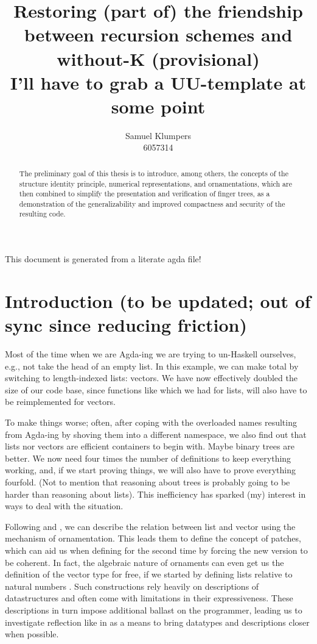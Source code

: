 \documentclass{article}
\title{Restoring (part of) the friendship between recursion schemes and without-K (provisional)\\ \small I'll have to grab a UU-template at some point}
\author{Samuel Klumpers\\6057314}
\theoremstyle{plain}%
\theoremstyle{definition}
\begin{document}
\maketitle
\tableofcontents

This document is generated from a literate agda file!
\newpage

\begin{abstract}
    The preliminary goal of this thesis is to introduce, among others, the concepts of the structure identity principle, numerical representations, and ornamentations, which are then combined to simplify the presentation and verification of finger trees, as a demonstration of the generalizability and improved compactness and security of the resulting code. 
\end{abstract}

\section{Introduction (to be updated; out of sync since reducing friction)}\label{sec:intro}
Most of the time when we are Agda-ing \cite{agda} we are trying to un-Haskell ourselves, e.g., not take the head of an empty list. In this example, we can make  total by switching to length-indexed lists: vectors. We have now effectively doubled the size of our code base, since functions like \AgdaFunction{\_++\_} which we had for lists, will also have to be reimplemented for vectors.

To make things worse; often, after coping with the overloaded names resulting from Agda-ing by shoving them into a different namespace, we also find out that lists nor vectors are efficient containers to begin with. Maybe binary trees are better. We now need four times the number of definitions to keep everything working, and, if we start proving things, we will also have to prove everything fourfold. (Not to mention that reasoning about trees is probably going to be harder than reasoning about lists).  This inefficiency has sparked (my) interest in ways to deal with the situation.

Following \cite{orntrans} and \cite{progorn}, we can describe the relation between list and vector using the mechanism of ornamentation. This leads them to define the concept of patches, which can aid us when defining \AgdaFunction{\_++\_} for the second time by forcing the new version to be coherent. In fact, the algebraic nature of ornaments can even get us the definition of the vector type for free, if we started by defining lists relative to natural numbers \cite{algorn}. Such constructions rely heavily on descriptions of datastructures and often come with limitations in their expressiveness. These descriptions in turn impose additional ballast on the programmer, leading us to investigate reflection like in \cite{practgen} as a means to bring datatypes and descriptions closer when possible.
\end{document}

